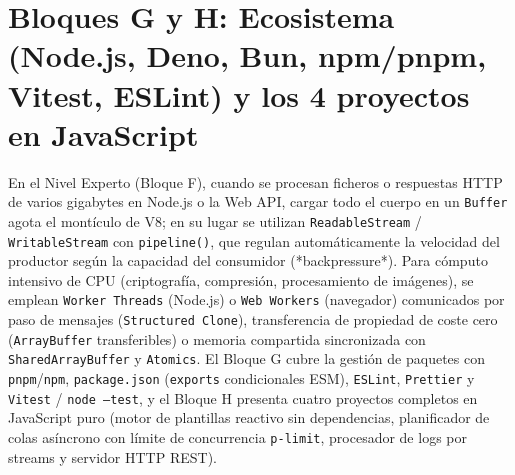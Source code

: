 \documentclass{book}
\begin{document}
\section{Bloques G y H: Ecosistema (Node.js, Deno, Bun, npm/pnpm, Vitest, ESLint) y los 4 proyectos en JavaScript}

En el Nivel Experto (Bloque F), cuando se procesan ficheros o respuestas HTTP de varios gigabytes en Node.js o la Web API, cargar todo el cuerpo en un \texttt{Buffer} agota el montículo de V8; en su lugar se utilizan \texttt{ReadableStream} / \texttt{WritableStream} con \texttt{pipeline()}, que regulan automáticamente la velocidad del productor según la capacidad del consumidor (*backpressure*). Para cómputo intensivo de CPU (criptografía, compresión, procesamiento de imágenes), se emplean \texttt{Worker Threads} (Node.js) o \texttt{Web Workers} (navegador) comunicados por paso de mensajes (\texttt{Structured Clone}), transferencia de propiedad de coste cero (\texttt{ArrayBuffer} transferibles) o memoria compartida sincronizada con \texttt{SharedArrayBuffer} y \texttt{Atomics}. El Bloque G cubre la gestión de paquetes con \texttt{pnpm}/\texttt{npm}, \texttt{package.json} (\texttt{exports} condicionales ESM), \texttt{ESLint}, \texttt{Prettier} y \texttt{Vitest} / \texttt{node --test}, y el Bloque H presenta cuatro proyectos completos en JavaScript puro (motor de plantillas reactivo sin dependencias, planificador de colas asíncrono con límite de concurrencia \texttt{p-limit}, procesador de logs por streams y servidor HTTP REST).
\end{document}

